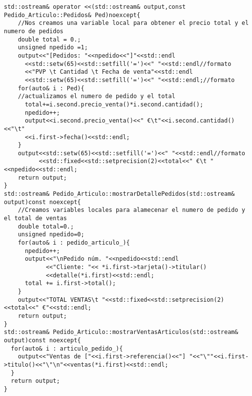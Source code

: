 \begin{verbatim}
std::ostream& operator <<(std::ostream& output,const Pedido_Articulo::Pedidos& Ped)noexcept{
    //Nos creamos una variable local para obtener el precio total y el numero de pedidos
    double total = 0.;
    unsigned npedido =1;
    output<<"[Pedidos: "<<npedido<<"]"<<std::endl
      <<std::setw(65)<<std::setfill('=')<<" "<<std::endl//formato
      <<"PVP \t Cantidad \t Fecha de venta"<<std::endl
      <<std::setw(65)<<std::setfill('=')<<" "<<std::endl;//formato
    for(auto& i : Ped){
    //actualizamos el numero de pedido y el total
      total+=i.second.precio_venta()*i.second.cantidad();
      npedido++;
      output<<i.second.precio_venta()<<" €\t"<<i.second.cantidad()<<"\t"
      <<i.first->fecha()<<std::endl;
    }
    output<<std::setw(65)<<std::setfill('=')<<" "<<std::endl//formato
          <<std::fixed<<std::setprecision(2)<<total<<" €\t "<<npedido<<std::endl;
    return output;
}
std::ostream& Pedido_Articulo::mostrarDetallePedidos(std::ostream& output)const noexcept{
    //Creamos variables locales para alamecenar el numero de pedido y el total de ventas
    double total=0.;
    unsigned npedido=0;
    for(auto& i : pedido_articulo_){
      npedido++;
      output<<"\nPedido núm. "<<npedido<<std::endl
            <<"Cliente: "<< *i.first->tarjeta()->titular()
            <<detalle(*i.first)<<std::endl;
      total += i.first->total();
    }
    output<<"TOTAL VENTAS\t "<<std::fixed<<std::setprecision(2)<<total<<" €"<<std::endl;
    return output;
}
std::ostream& Pedido_Articulo::mostrarVentasArticulos(std::ostream& output)const noexcept{
  for(auto& i : articulo_pedido_){
    output<<"Ventas de ["<<i.first->referencia()<<"] "<<"\""<<i.first->titulo()<<"\"\n"<<ventas(*i.first)<<std::endl;
  }
  return output;
}
\end{verbatim}